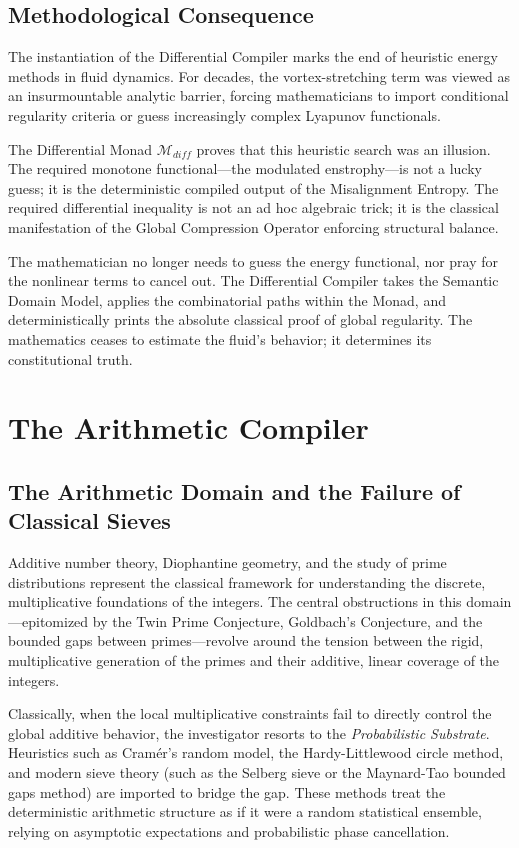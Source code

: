 \documentclass[12pt,openany]{extbook}
\theoremstyle{plain}
\theoremstyle{definition}
\begin{document}
\section{Methodological Consequence}

The instantiation of the Differential Compiler marks the end of heuristic energy methods in fluid dynamics. For decades, the vortex-stretching term was viewed as an insurmountable analytic barrier, forcing mathematicians to import conditional regularity criteria or guess increasingly complex Lyapunov functionals.

The Differential Monad $\mathcal{M}_{diff}$ proves that this heuristic search was an illusion. The required monotone functional—the modulated enstrophy—is not a lucky guess; it is the deterministic compiled output of the Misalignment Entropy. The required differential inequality is not an ad hoc algebraic trick; it is the classical manifestation of the Global Compression Operator enforcing structural balance.

The mathematician no longer needs to guess the energy functional, nor pray for the nonlinear terms to cancel out. The Differential Compiler takes the Semantic Domain Model, applies the combinatorial paths within the Monad, and deterministically prints the absolute classical proof of global regularity. The mathematics ceases to estimate the fluid's behavior; it determines its constitutional truth.

\chapter{The Arithmetic Compiler}

\section{The Arithmetic Domain and the Failure of Classical Sieves}

Additive number theory, Diophantine geometry, and the study of prime distributions represent the classical framework for understanding the discrete, multiplicative foundations of the integers. The central obstructions in this domain—epitomized by the Twin Prime Conjecture, Goldbach's Conjecture, and the bounded gaps between primes—revolve around the tension between the rigid, multiplicative generation of the primes and their additive, linear coverage of the integers.

Classically, when the local multiplicative constraints fail to directly control the global additive behavior, the investigator resorts to the \emph{Probabilistic Substrate}. Heuristics such as Cram\'{e}r's random model, the Hardy-Littlewood circle method, and modern sieve theory (such as the Selberg sieve or the Maynard-Tao bounded gaps method) are imported to bridge the gap. These methods treat the deterministic arithmetic structure as if it were a random statistical ensemble, relying on asymptotic expectations and probabilistic phase cancellation. 
\end{document}
